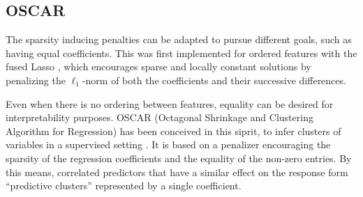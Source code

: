 \subsection{OSCAR}

The sparsity inducing penalties can be adapted to pursue different goals, such
as having equal coefficients.  This was first implemented for ordered features
with the fused Lasso \citep{Tibshirani05}, which encourages sparse and locally
constant solutions by penalizing the $\ell_1$-norm of both the coefficients and
their successive differences.

Even when there is no ordering between features, equality can be desired for
interpretability purposes.  OSCAR (Octagonal Shrinkage and Clustering Algorithm
for Regression) has been conceived in this siprit, to infer clusters of
variables in a supervised setting \citep{Bondell08}.
It is based on a penalizer encouraging the sparsity of the regression
coefficients and the equality of the non-zero entries.
By this means, correlated predictors that have a similar effect on the response
form ``predictive clusters'' represented by a single coefficient.





